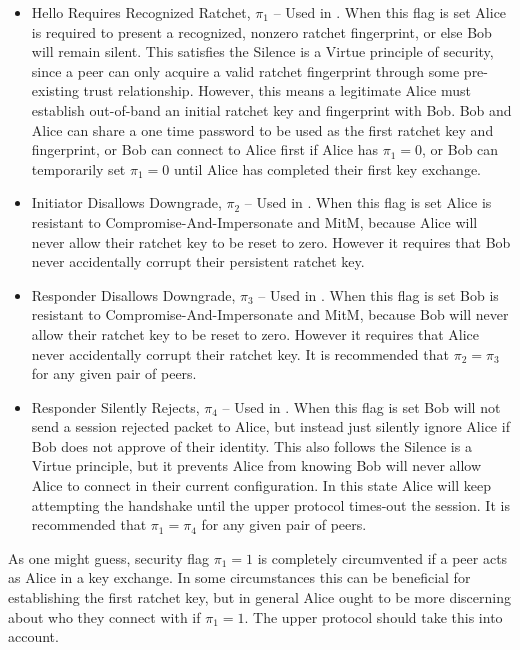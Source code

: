\documentclass{article}
\begin{document}
\begin{itemize}
	\item Hello Requires Recognized Ratchet, $\pi_1$ -- Used in . When this flag is set Alice is required to present a recognized, nonzero ratchet fingerprint, or else Bob will remain silent. This satisfies the Silence is a Virtue principle of security, since a peer can only acquire a valid ratchet fingerprint through some pre-existing trust relationship. However, this means a legitimate Alice must establish out-of-band an initial ratchet key and fingerprint with Bob. Bob and Alice can share a one time password to be used as the first ratchet key and fingerprint, or Bob can connect to Alice first if Alice has $\pi_1=0$, or Bob can temporarily set $\pi_1=0$ until Alice has completed their first key exchange.
	\item Initiator Disallows Downgrade, $\pi_2$ -- Used in . When this flag is set Alice is resistant to Compromise-And-Impersonate and MitM, because Alice will never allow their ratchet key to be reset to zero. However it requires that Bob never accidentally corrupt their persistent ratchet key.
	\item Responder Disallows Downgrade, $\pi_3$ -- Used in . When this flag is set Bob is resistant to Compromise-And-Impersonate and MitM, because Bob will never allow their ratchet key to be reset to zero. However it requires that Alice never accidentally corrupt their ratchet key. It is recommended that $\pi_2=\pi_3$ for any given pair of peers.
	\item Responder Silently Rejects, $\pi_4$ -- Used in . When this flag is set Bob will not send a session rejected packet to Alice, but instead just silently ignore Alice if Bob does not approve of their identity. This also follows the Silence is a Virtue principle, but it prevents Alice from knowing Bob will never allow Alice to connect in their current configuration. In this state Alice will keep attempting the handshake until the upper protocol times-out the session. It is recommended that $\pi_1=\pi_4$ for any given pair of peers.
\end{itemize}

As one might guess, security flag $\pi_1 = 1$ is completely circumvented if a peer acts as Alice in a key exchange. In some circumstances this can be beneficial for establishing the first ratchet key, but in general Alice ought to be more discerning about who they connect with if $\pi_1 = 1$. The upper protocol should take this into account.
\end{document}

